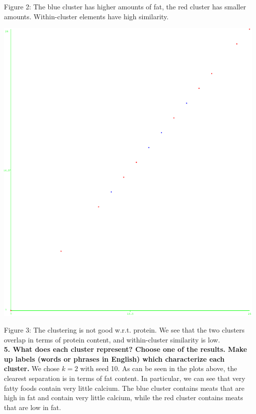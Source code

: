 \documentclass[]{article}
\begin{document}
\noindent Figure 2: The blue cluster has higher amounts of fat, the red cluster has smaller amounts. Within-cluster elements have high similarity.

\includegraphics[scale=0.25]{figures/protein_protein.eps}

\noindent Figure 3: The clustering is not good w.r.t. protein. We see that the two clusters overlap in terms of protein content, and within-cluster similarity is low.\\

\noindent\textbf{5. What does each cluster represent? Choose one of the results. Make up labels (words or phrases in English) which characterize each cluster.}
We chose $k=2$ with seed 10. As can be seen in the plots above, the clearest separation is in terms of fat content. In particular, we can see that very fatty foods contain very little calcium. The blue cluster contains meats that are high in fat and contain very little calcium, while the red cluster contains meats that are low in fat.

\end{document}
